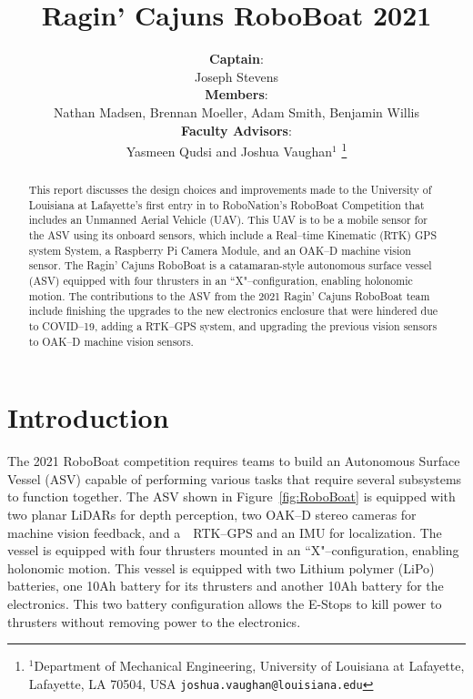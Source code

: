 \documentclass[letterpaper, 12 pt, conference]{ieeeconf}
\title{\LARGE \bf Ragin' Cajuns RoboBoat 2021}
\author{\textbf{Captain}:\\Joseph Stevens \\
\textbf{Members}:\\Nathan Madsen, Brennan Moeller, Adam Smith, Benjamin Willis\\
\textbf{Faculty Advisors}:\\Yasmeen Qudsi and Joshua Vaughan$^{1}$%
\thanks{$^{1}$Department of Mechanical Engineering,
        University of Louisiana at Lafayette, Lafayette, LA 70504, USA
        {\tt\small joshua.vaughan@louisiana.edu}}}
\begin{document}
\thispagestyle{empty}
\maketitle
\begin{abstract}
This report discusses the design choices and improvements made to the University of Louisiana at Lafayette's first entry in to RoboNation's RoboBoat Competition that includes an Unmanned Aerial Vehicle (UAV). This UAV is to be a mobile sensor for the ASV using its onboard sensors, which include a Real--time Kinematic (RTK) GPS system System, a Raspberry Pi Camera Module, and an OAK--D machine vision sensor. The Ragin' Cajuns RoboBoat is a catamaran-style autonomous surface vessel (ASV) equipped with four thrusters in an ``X"--configuration, enabling holonomic motion. The contributions to the ASV from the 2021 Ragin' Cajuns RoboBoat team include finishing the upgrades to the new electronics enclosure that were hindered due to COVID--19, adding a RTK--GPS system, and upgrading the previous vision sensors to OAK--D machine vision sensors.
\end{abstract}
% 

\section{Introduction}
% 
The 2021 RoboBoat competition requires teams to build an Autonomous Surface Vessel (ASV) capable of performing various tasks that require several subsystems to function together. The ASV shown in Figure~\ref{fig:RoboBoat} is equipped with two planar LiDARs for depth perception, two OAK--D stereo cameras for machine vision feedback, and a~~RTK--GPS and an IMU for localization. The vessel is equipped with four thrusters mounted in an ``X"--configuration, enabling holonomic motion. This vessel is equipped with two Lithium polymer (LiPo) batteries, one 10Ah battery for its thrusters and another 10Ah battery for the electronics. This two battery configuration allows the E-Stops to kill power to thrusters without removing power to the electronics. 
\end{document}
